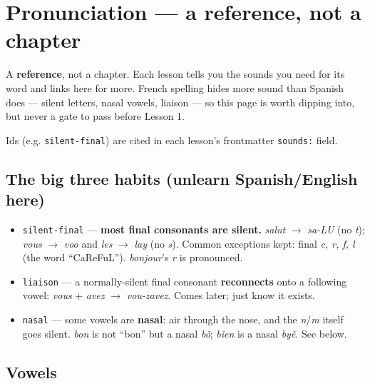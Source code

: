 
\chapter*{Pronunciation --- a reference, not a chapter}

A \textbf{reference}, not a chapter. Each lesson tells you the sounds you need for its word and links here for more. French spelling hides more sound than Spanish does — silent letters, nasal vowels, liaison — so this page is worth dipping into, but never a gate to pass before Lesson 1.

Ids (e.g. \texttt{silent-final}) are cited in each lesson's frontmatter \texttt{sounds:} field.

\section*{The big three habits (unlearn Spanish/English here)}

\begin{itemize}
\raggedright
\setlength{\itemsep}{0.35em}
  \item \texttt{silent-final} — \textbf{most final consonants are silent.} \emph{salut} $\to$ \emph{sa-LU} (no \emph{t}); \emph{vous} $\to$ \emph{voo} and \emph{les} $\to$ \emph{lay} (no \emph{s}). Common exceptions kept: final \emph{c, r, f, l} (the word \textquotedblleft{}CaReFuL\textquotedblright{}). \emph{bonjour}'s \emph{r} is pronounced.
  \item \texttt{liaison} — a normally-silent final consonant \textbf{reconnects} onto a following vowel: \emph{vous} + \emph{avez} $\to$ \emph{vou-zavez}. Comes later; just know it exists.
  \item \texttt{nasal} — some vowels are \textbf{nasal}: air through the nose, and the \emph{n}/\emph{m} itself goes silent. \emph{bon} is not \textquotedblleft{}bon\textquotedblright{} but a nasal \emph{bõ}; \emph{bien} is a nasal \emph{byẽ}. See below.
\end{itemize}

\section*{Vowels}

